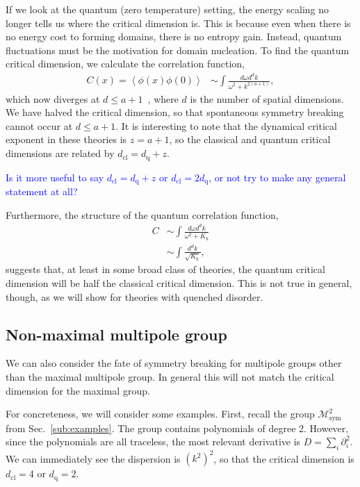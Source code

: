 \documentclass[pra,aps,twocolumn, amsfonts,amsmath,amssymb,nofootinbib,superscriptaddress]{revtex4}
\newcommand{\charlie}[1]{\textcolor{Blue}{#1}}
\newcommand{\nn}{\nonumber\\}
\newcommand{\cl}{\text{cl}}
\newcommand{\q}{\text{q}}
\begin{document}
If we look at the quantum (zero temperature) setting, the energy scaling no longer tells us where the critical dimension is. This is because even when there is no energy cost to forming domains, there is no entropy gain. Instead, quantum fluctuations must be the motivation for domain nucleation. To find the quantum critical dimension, we calculate the correlation function,
\begin{align}
C(x) = \left\langle \phi(x) \phi(0) \right\rangle &\sim \int \frac{d\omega d^dk}{\omega^2 + k^{2( a + 1 )}},
\end{align}
which now diverges at $d\le a+1$~\cite{Griffin2015}, where $d$ is the number of spatial dimensions. We have halved the critical dimension, so that spontaneous symmetry breaking cannot occur at $d\le a+1$. It is interesting to note that the dynamical critical exponent in these theories is $z = a+1$, so the classical and quantum critical dimensions are related by $d_\text{cl} = d_\text{q} + z$.

\charlie{Is it more useful to say $d_\text{cl} = d_\text{q} + z$ or $d_\text{cl} = 2 d_\text{q}$, or not try to make any general statement at all?} 

Furthermore, the structure of the quantum correlation function,
\begin{align}
C &\sim \int \frac{d\omega d^dk}{\omega^2 + K_k}\nn
&\sim \int \frac{d^dk}{\sqrt{K_k}},
\end{align}
suggests that, at least in some broad class of theories, the quantum critical dimension will be half the classical critical dimension. This is not true in general, though, as we will show for theories with quenched disorder.

\subsection{Non-maximal multipole group} \label{sub:nonmax}

We can also consider the fate of symmetry breaking for multipole groups other than the maximal multipole group. In general this will not match the critical dimension for the maximal group. 

For concreteness, we will consider some examples. First, recall the group $\mathcal{M}^2_\text{sym}$ from Sec.~\ref{sub:examples}. The group contains polynomials of degree 2. However, since the polynomials are all traceless, the most relevant derivative is $D = \sum_i \partial^2_i$.  We can immediately see the dispersion is $(k^2)^2$, so that the critical dimension is $d_\cl = 4$ or $d_\q = 2$.
\end{document}
